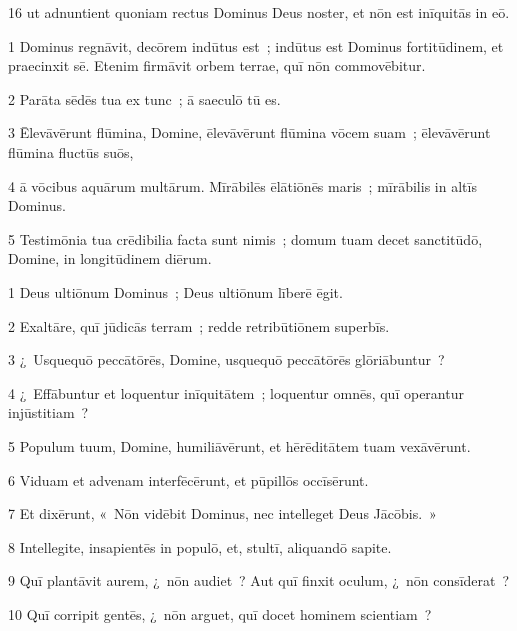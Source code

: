 \psalmVerse
  {\phantom{0}16}
  {ut adnuntient quoniam rectus Dominus Deus noster, et nōn est inīquitās in eō.}



\psalmVerse
  {\phantom{00}1}
  {Dominus regnāvit, decōrem indūtus est~; indūtus est Dominus fortitūdinem, et praecinxit sē. Etenim firmāvit orbem terrae, quī nōn commovēbitur.}


\psalmVerse
  {\phantom{00}2}
  {Parāta sēdēs tua ex tunc~; ā saeculō tū es.}


\psalmVerse
  {\phantom{00}3}
  {Ēlevāvērunt flūmina, Domine, ēlevāvērunt flūmina vōcem suam~; ēlevāvērunt flūmina fluctūs suōs,}


\psalmVerse
  {\phantom{00}4}
  {ā vōcibus aquārum multārum. Mīrābilēs ēlātiōnēs maris~; mīrābilis in altīs Dominus.}


\psalmVerse
  {\phantom{00}5}
  {Testimōnia tua crēdibilia facta sunt nimis~; domum tuam decet sanctitūdō, Domine, in longitūdinem diērum.}



\psalmVerse
  {\phantom{00}1}
  {Deus ultiōnum Dominus~; Deus ultiōnum līberē ēgit.}


\psalmVerse
  {\phantom{00}2}
  {Exaltāre, quī jūdicās terram~; redde retribūtiōnem superbīs.}


\psalmVerse
  {\phantom{00}3}
  {¿~Usquequō peccātōrēs, Domine, usquequō peccātōrēs glōriābuntur~?}


\psalmVerse
  {\phantom{00}4}
  {¿~Effābuntur et loquentur inīquitātem~; loquentur omnēs, quī operantur injūstitiam~?}


\psalmVerse
  {\phantom{00}5}
  {Populum tuum, Domine, humiliāvērunt, et hērēditātem tuam vexāvērunt.}


\psalmVerse
  {\phantom{00}6}
  {Viduam et advenam interfēcērunt, et pūpillōs occīsērunt.}


\psalmVerse
  {\phantom{00}7}
  {Et dixērunt, «~Nōn vidēbit Dominus, nec intelleget Deus Jācōbis.~»}


\psalmVerse
  {\phantom{00}8}
  {Intellegite, insapientēs in populō, et, stultī, aliquandō sapite.}


\psalmVerse
  {\phantom{00}9}
  {Quī plantāvit aurem, ¿~nōn audiet~? Aut quī finxit oculum, ¿~nōn consīderat~?}


\psalmVerse
  {\phantom{0}10}
  {Quī corripit gentēs, ¿~nōn arguet, quī docet hominem scientiam~?}


